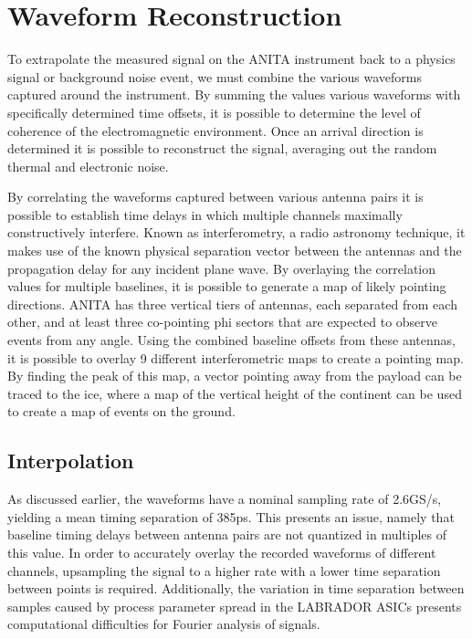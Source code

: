 \section{Waveform Reconstruction}%
	To extrapolate the measured signal on the ANITA instrument back to a physics signal or background noise event, we must combine the various waveforms captured around the instrument.  By summing the values various waveforms with specifically determined time offsets, it is possible to determine the level of coherence of the electromagnetic environment.  Once an arrival direction is determined it is possible to reconstruct the signal, averaging out the random thermal and electronic noise.
	
	By correlating the waveforms captured between various antenna pairs it is possible to establish time delays in which multiple channels maximally constructively interfere.  Known as interferometry, a radio astronomy technique, it makes use of the known physical separation vector between the antennas and the propagation delay for any incident plane wave.\cite{interferometry}  By overlaying the correlation values for multiple baselines, it is possible to generate a map of likely pointing directions.  ANITA has three vertical tiers of antennas, each separated from each other, and at least three co-pointing phi sectors that are expected to observe events from any angle.  Using the combined baseline offsets from these antennas, it is possible to overlay 9 different interferometric maps to create a pointing map.  By finding the peak of this map, a vector pointing away from the payload can be traced to the ice, where a map of the vertical height of the continent can be used to create a map of events on the ground.
	
	\subsection{Interpolation}
		As discussed earlier, the waveforms have a nominal sampling rate of 2.6GS/s, yielding a mean timing separation of 385ps.  This presents an issue, namely that baseline timing delays between antenna pairs are not quantized in multiples of this value.  In order to accurately overlay the recorded waveforms of different channels, upsampling the signal to a higher rate with a lower time separation between points is required.  Additionally, the variation in time separation between samples caused by process parameter spread in the LABRADOR ASICs presents computational difficulties for Fourier analysis of signals.
		
